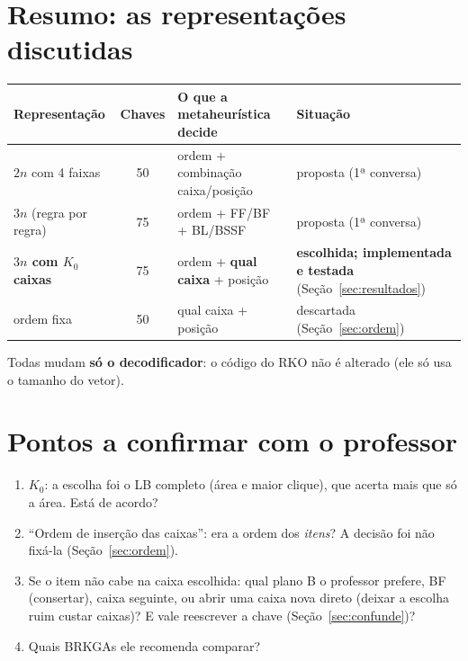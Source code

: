 \documentclass[11pt,a4paper]{article}
\begin{document}
\section{Resumo: as representações discutidas}
\begin{center}\small
\begin{tabular}{@{}>{\raggedright\arraybackslash}p{3.9cm}c>{\raggedright\arraybackslash}p{5.2cm}>{\raggedright\arraybackslash}p{4.6cm}@{}}
\toprule
Representação & Chaves & O que a metaheurística decide & Situação \\ \midrule
$2n$ com 4 faixas & 50 & ordem + combinação caixa/posição & proposta (1ª conversa) \\
$3n$ (regra por regra) & 75 & ordem + FF/BF + BL/BSSF & proposta (1ª conversa) \\
\textbf{$3n$ com $K_0$ caixas} & 75 & ordem + \textbf{qual caixa} + posição & \textbf{escolhida; implementada e testada} (Seção~\ref{sec:resultados}) \\
ordem fixa & 50 & qual caixa + posição & descartada (Seção~\ref{sec:ordem}) \\
\bottomrule
\end{tabular}
\end{center}

\noindent Todas mudam \textbf{só o decodificador}: o código do RKO não é alterado (ele só usa o tamanho do vetor).

\section{Pontos a confirmar com o professor}
\begin{enumerate}[leftmargin=*,itemsep=2pt]
\item $K_0$: a escolha foi o LB completo (área e maior clique), que acerta mais que só a área. Está de acordo?
\item ``Ordem de inserção das caixas'': era a ordem dos \emph{itens}? A decisão foi não fixá-la (Seção~\ref{sec:ordem}).
\item Se o item não cabe na caixa escolhida: qual plano B o professor prefere, BF (consertar), caixa seguinte, ou
  abrir uma caixa nova direto (deixar a escolha ruim custar caixas)? E vale reescrever a chave (Seção~\ref{sec:confunde})?
\item Quais BRKGAs ele recomenda comparar?
\end{enumerate}
\end{document}
